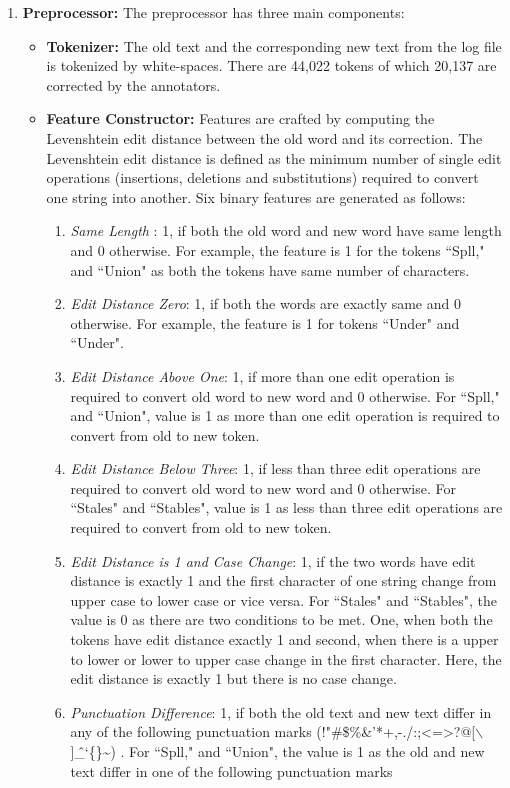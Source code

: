 \documentclass[letterpaper]{article}
\begin{document}
\begin{enumerate}
\item \textbf{Preprocessor: } The preprocessor has three main components:
\begin{itemize}
\item \textbf{Tokenizer: } The old text and the corresponding new text from the log file is tokenized by white-spaces. There are 44,022 tokens of which 20,137 are corrected by the annotators.

\item \textbf{Feature Constructor: } Features are crafted by computing the Levenshtein edit distance between the old word and its correction. The Levenshtein edit distance \cite{Wagner_74} is defined as the minimum number of single edit operations (insertions, deletions and substitutions) required to convert one string into another. Six binary features are generated as follows: 


\begin{enumerate}
\item \textit{Same Length} : 1, if both the old word and new word have same length and $0$ otherwise. For example, the feature is 1 for the tokens ``Spll," and ``Union" as  both the tokens have same number of characters.
\item \textit{Edit Distance Zero}:  1, if both the words are exactly same and $0$ otherwise. For example, the feature is 1 for tokens ``Under" and ``Under". 
\item \textit{Edit Distance Above One}: 1, if more than one edit operation is required to convert old word to new word and $0$ otherwise. For ``Spll," and ``Union", value is 1 as more than one edit operation is required to convert from old to new token.
\item \textit{Edit Distance Below Three}: 1, if less than three edit operations are required to convert old word to new word and $0$ otherwise. For ``Stales" and ``Stables", value is 1 as less than three edit operations are required to convert from old to new token. 
\item \textit{Edit Distance is 1 and Case Change}: 1, if the two words have edit distance is exactly 1 and the first character of one string change from upper case to lower case or vice versa. For ``Stales" and ``Stables", the value is 0 as there are two conditions to be met. One, when both the tokens have edit distance exactly 1 and second, when there is a upper to lower or lower to upper case change in the first character. Here, the edit distance is exactly 1 but there is no case change.
\item \textit{Punctuation Difference}: 1, if both the old text and new text differ in any of the following punctuation marks (!"\#\$\%\&'*+,-./:;\textless=\textgreater?@[$\backslash$]\^\_`\{\textbar\}\textasciitilde)
. For ``Spll," and ``Union", the value is 1 as the old and new text differ in one of the following punctuation marks
\end{enumerate}


\end{itemize}
\end{enumerate}
\end{document}
